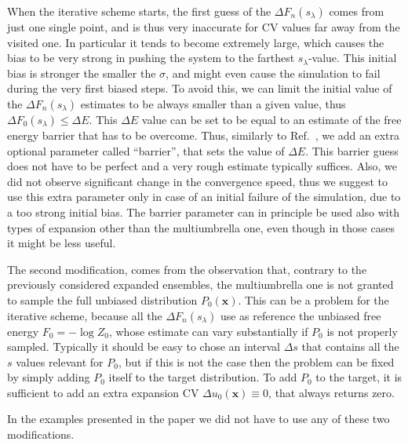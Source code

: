 \documentclass[aps,prx,reprint,superscriptaddress]{revtex4-1} %
\begin{document}
When the iterative scheme starts, the first guess of the $\Delta F_n(s_\lambda)$ comes from just one single point, and is thus very inaccurate for CV values far away from the visited one.
In particular it tends to become extremely large, which causes the bias to be very strong in pushing the system to the farthest $s_\lambda$-value.
This initial bias is stronger the smaller the $\sigma$, and might even cause the simulation to fail during the very first biased steps.
To avoid this, we can limit the initial value of the $\Delta F_n(s_\lambda)$ estimates to be always smaller than a given value, thus $\Delta F_0(s_\lambda) \le \Delta E$.
This $\Delta E$ value can be set to be equal to an estimate of the free energy barrier that has to be overcome.
Thus, similarly to Ref.~, we add an extra optional parameter called ``barrier'', that sets the value of $\Delta E$.
This barrier guess does not have to be perfect and a very rough estimate typically suffices.
Also, we did not observe significant change in the convergence speed, thus we suggest to use this extra parameter only in case of an initial failure of the simulation, due to a too strong initial bias.
The barrier parameter can in principle be used also with types of expansion other than the multiumbrella one, even though in those cases it might be less useful.

The second modification, comes from the observation that, contrary to the previously considered expanded ensembles, the multiumbrella one is not granted to sample the full unbiased distribution $P_0(\mathbf{x})$.
This can be a problem for the iterative scheme, because all the $\Delta F_n(s_\lambda)$ use as reference the unbiased free  energy $F_0=-\log Z_0$, whose estimate can vary substantially if $P_0$ is not properly sampled.
Typically it should be easy to chose an interval $\Delta s$ that contains all the $s$ values relevant for $P_0$, but if this is not the case then the problem can be fixed by simply adding $P_0$ itself to the target distribution.
To add $P_0$ to the target, it is sufficient to add an extra expansion CV $\Delta u_0(\mathbf{x}) \equiv 0$, that always returns zero.

In the examples presented in the paper we did not have to use any of these two modifications.



\end{document}
